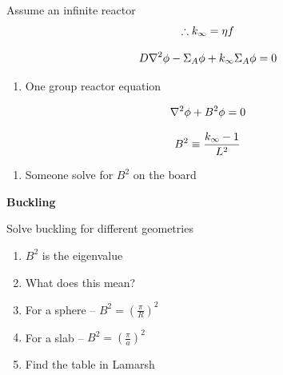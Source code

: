 \documentclass[aspectratio=1610,pdftex,dvipsnames,compress,xcolor={dvipsnames}]{beamer}
\begin{document}
\begin{frame}{Assume an infinite reactor}
    \begin{equation}
        \LARGE
        \therefore k_\infty = \eta f
    \end{equation}

    \begin{equation}
        \LARGE
        D \nabla^2 \phi - \Sigma_A \phi + k_\infty \Sigma_A \phi = 0
    \end{equation}

    \vspace*{\fill}

    \begin{enumerate}[series=outerlist,topsep=0pt,itemsep=21pt,leftmargin=*,label=(\arabic*)]
        \item[]One group reactor equation
    \end{enumerate}

    \vspace*{\fill}

    \begin{equation}
        \LARGE
        \nabla^2 \phi + B^2 \phi = 0
    \end{equation}

    \begin{equation}
        \LARGE
        B^2 \equiv \frac{k_\infty - 1}{L^2}
    \end{equation}

    \vspace*{\fill}

    \begin{enumerate}[series=outerlist,topsep=0pt,itemsep=21pt,leftmargin=*,label=(\arabic*)]
        \item[]Someone solve for $B^2$ on the board
    \end{enumerate}
\end{frame}


\begin{frame}[plain]{}
    \centering\LARGE\textbf{Buckling}
\end{frame}


\addtocounter{framenumber}{-1} 
\begin{frame}{Solve buckling for different geometries}
    \begin{enumerate}[series=outerlist,topsep=0pt,itemsep=21pt,leftmargin=*,label=(\arabic*)]
        \item[]$B^2$ is the eigenvalue
        \item[]What does this mean?
        \item[]For a sphere -- $B^2 = (\frac{\pi}{R})^2$
        \item[]For a slab -- $B^2 = (\frac{\pi}{a})^2$
        \item[]Find the table in Lamarsh
    \end{enumerate}
\end{frame}
\end{document}
